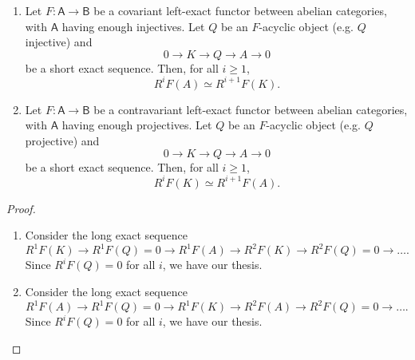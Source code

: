 \begin{thm}\leavevmode\vspace{-.2\baselineskip}
	\begin{enumerate}
		\item Let $F\colon \mathsf{A} \to \mathsf{B}$ be a covariant left-exact functor
			between abelian categories, with $\mathsf{A}$ having enough injectives.
			Let $Q$ be an $F$-acyclic object (e.g. $Q$ injective) and
			\begin{equation}
			0 \to K \to Q \to A \to 0
			\end{equation} 
			be a short exact sequence.
			Then, for all $i \geq 1$,
			\begin{equation}
				R^iF(A) \simeq R^{i+1}F(K)
			.\end{equation} 
		\item Let $F\colon \mathsf{A} \to \mathsf{B}$ be a contravariant left-exact functor
			between abelian categories, with $\mathsf{A}$ having enough projectives.
			Let $Q$ be an $F$-acyclic object (e.g. $Q$ projective) and
			\begin{equation}
			0 \to K \to Q \to A \to 0
			\end{equation} 
			be a short exact sequence.
			Then, for all $i \geq 1$,
			\begin{equation}
				R^iF(K) \simeq R^{i+1}F(A)
			.\end{equation} 
	\end{enumerate}
\end{thm}
\begin{proof}\leavevmode\vspace{-.2\baselineskip}
	\begin{enumerate}
		\item Consider the long exact sequence
			\begin{equation}
				R^1F(K) \to R^1F(Q) = 0 \to R^1F(A) \to
				R^2F(K) \to R^2F(Q) = 0 \to \ldots
			.\end{equation} 
			Since $R^iF(Q) = 0$ for all $i$, we have our thesis.
		\item Consider the long exact sequence
			\begin{equation}
				R^1F(A) \to R^1F(Q) = 0 \to R^1F(K) \to
				R^2F(A) \to R^2F(Q) = 0 \to \ldots
			.\end{equation} 
			Since $R^iF(Q) = 0$ for all $i$, we have our thesis.\qedhere
	\end{enumerate}
\end{proof}

